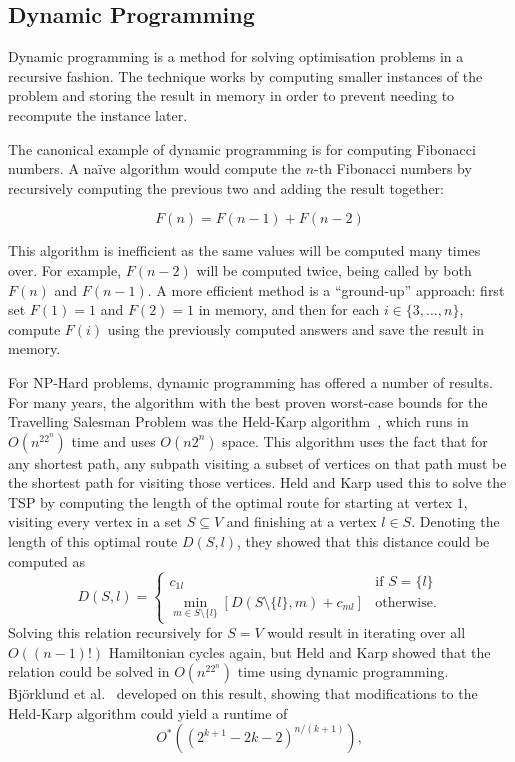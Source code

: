 \subsection{Dynamic Programming}

Dynamic programming is a method for solving optimisation problems in a recursive fashion. The technique works by computing smaller instances of the problem and storing the result in memory in order to prevent needing to recompute the instance later.

The canonical example of dynamic programming is for computing Fibonacci numbers. A na\"{i}ve algorithm would compute the $n$-th Fibonacci numbers by recursively computing the previous two and adding the result together:

$$F(n) = F(n-1) + F(n-2)$$

This algorithm is inefficient as the same values will be computed many times over. For example, $F(n-2)$ will be computed twice, being called by both $F(n)$ and $F(n-1)$. A more efficient method is a ``ground-up'' approach: first set $F(1)=1$ and $F(2)=1$ in memory, and then for each $i \in \{3,\dots,n\}$, compute $F(i)$ using the previously computed answers and save the result in memory.

For NP-Hard problems, dynamic programming has offered a number of results. For many years, the algorithm with the best proven worst-case bounds for the Travelling Salesman Problem was the Held-Karp algorithm~\cite{held1962}, which runs in $O(n^22^n)$ time and uses $O(n2^n)$ space. This algorithm uses the fact that for any shortest path, any subpath visiting a subset of vertices on that path must be the shortest path for visiting those vertices. Held and Karp used this to solve the TSP by computing the length of the optimal route for starting at vertex $1$, visiting every vertex in a set $S \subseteq V$ and finishing at a vertex $l \in S$. Denoting the length of this optimal route $D(S, l)$, they showed that this distance could be computed as
%
\begin{equation}
D(S, l) = \begin{cases} c_{1l} & \text{if } S = \{l\}\\
          \min_{m \in S \setminus \{l\}}\left[D(S \setminus \{l\}, m) + c_{ml}\right] & \text{otherwise.}
  \end{cases}
\end{equation}
%
Solving this relation recursively for $S=V$ would result in iterating over all $O((n-1)!)$ Hamiltonian cycles again, but Held and Karp showed that the relation could be solved in $O(n^22^n)$ time using dynamic programming. Bj{\"o}rklund et al.\ \cite{bjorklund2008} developed on this result, showing that modifications to the Held-Karp algorithm could yield a runtime of
%
\begin{equation}
O^*((2^{k + 1} - 2k - 2)^{n/(k + 1)}),
\end{equation}

